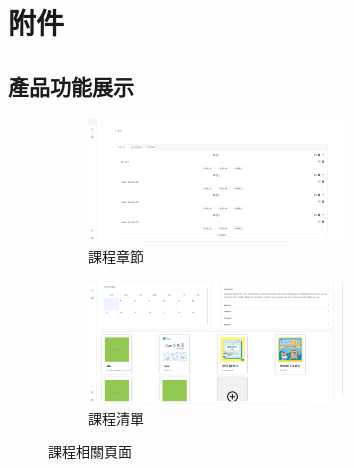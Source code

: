 \section{\centering 附件}

\subsection{產品功能展示}
\label{fig:Appendix-Product}
\begin{figure}[H]
	\begin{subfigure}{0.5\linewidth}
	  \centering
	  \includegraphics[width=0.75\textwidth]{images/chapter.png}
	  \caption{課程章節}
	\end{subfigure}
	\begin{subfigure}{0.5\linewidth}
	  \centering
	  \includegraphics[width=0.75\textwidth]{images/course.png}
	  \caption{課程清單}
	\end{subfigure}
	\caption{課程相關頁面}
	\label{fig:course}
  \end{figure}
  
